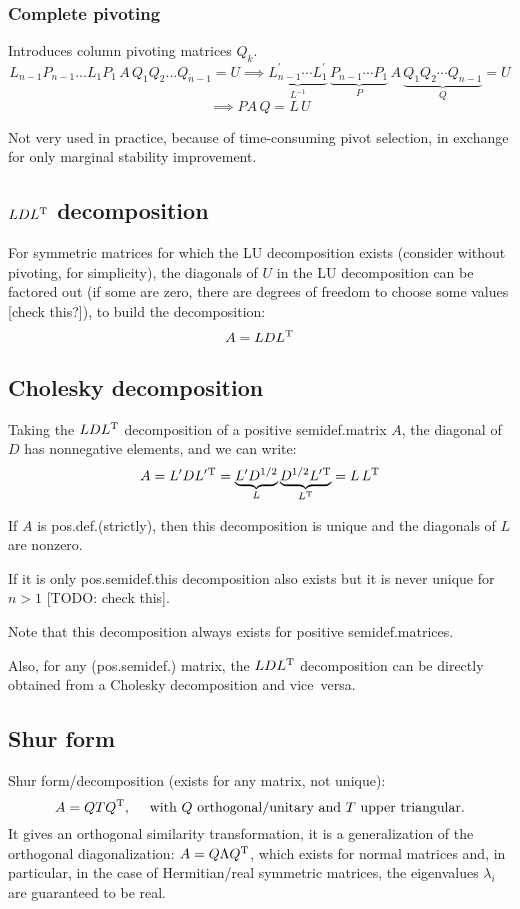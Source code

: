 \documentclass[
  12pt,
  paper=a4,
]{scrartcl} %
\begin{document}
\subsubsection*{Complete pivoting}

Introduces column pivoting matrices $Q_k$.
\[L_{n-1}P_{n-1}...L_{1}P_{1}\, A\, Q_1 Q_2 ...Q_{n-1} = U
\implies
    \underbrace{L_{n-1}^\prime \cdots L_1^\prime}_{L^{-1}}
    \,
    \underbrace{P_{n-1} \cdots P_{1}}_{P}
    \,
    A
    \,
    \underbrace{Q_{1}Q_{2} \cdots Q_{n-1}}_{Q}
    =
    U
\]
\[
\implies
\boxed{
    P A\, Q = L \,U
}
\]

Not very used in practice, because of time-consuming pivot selection, in exchange for only marginal stability improvement.

\subsection*{\texorpdfstring{$LDL^{\mathrm{T}}$}{LDLT} decomposition}

For symmetric matrices for which the LU decomposition exists (consider without pivoting, for simplicity), the diagonals of $U$ in the LU decomposition can be factored out (if some are zero, there are degrees of freedom to choose some values [check this?]), to build the decomposition:
\[
    A = L D L^{\mathrm{T}}
\]

\subsection*{Cholesky decomposition}

Taking the $LDL^{\mathrm{T}}$ decomposition of a positive semidef.\@ matrix $A$, the diagonal of $D$ has nonnegative elements, and we can write:
\[
A = L^\prime D L^\prime{}^{\mathrm{T}} 
    =
\underbrace{L^\prime D^{1/2}}_L 
\underbrace{D^{1/2} L^\prime{}^{\mathrm{T}}}_{L^{\mathrm{T}}}
=
L \,L^{\mathrm{T}}
\]

If $A$ is pos.\@ def.\@ (strictly), then this decomposition is unique and the diagonals of $L$ are nonzero.

If it is only pos.\@ semidef.\@ this decomposition also exists but it is never unique for $n>1$ [TODO: check this].

Note that this decomposition always exists for positive semidef.\@ matrices.

Also, for any (pos.\@ semidef.) matrix, the $LDL^{\mathrm{T}}$ decomposition can be directly obtained from a Cholesky decomposition and vice~versa.

\subsection*{Shur form}
Shur form/decomposition (exists for any matrix, not unique):
\[
    A = Q T Q^{\mathrm{T}}, \quad
    \text{ with $Q$ orthogonal/unitary and $T$ upper triangular.}
\]
It gives an orthogonal similarity transformation, it is a generalization of the orthogonal diagonalization: $A = Q \Lambda  Q^{\mathrm{T}}$, which exists for normal matrices and, in particular, in the case of Hermitian/real symmetric matrices, the eigenvalues $\lambda_i$ are guaranteed to be real.
\end{document}
